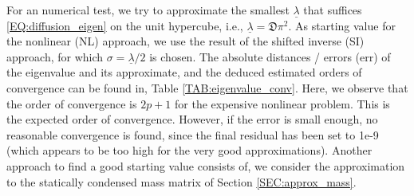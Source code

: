 \documentclass[a4paper, english, 12pt, reqno, draft]{amsart}
\theoremstyle{definition}
\theoremstyle{remark}
\numberwithin{equation}{section}
\newcommand{\globDim}{\ensuremath{\mathfrak D}}
\newcommand{\eigenval}{\ensuremath{\underline \lambda}}
\begin{document}
% 
For an numerical test, we try to approximate the smallest $\eigenval$ that suffices \eqref{EQ:diffusion_eigen} on the unit hypercube, i.e., $\eigenval = \globDim \pi^2$. As starting value for the nonlinear (NL) approach, we use the result of the shifted inverse (SI) approach, for which $\sigma = \eigenval / 2$ is chosen. The absolute distances / errors (err) of the eigenvalue and its approximate, and the deduced estimated orders of convergence can be found in, Table \ref{TAB:eigenvalue_conv}. Here, we observe that the order of convergence is $2p+1$ for the expensive nonlinear problem. This is the expected order of convergence. However, if the error is small enough, no reasonable convergence is found, since the final residual has been set to 1e-9 (which appears to be too high for the very good approximations). Another approach to find a good starting value consists of, we consider the approximation to the statically condensed mass matrix of Section \ref{SEC:approx_mass}.
% 
\end{document}
